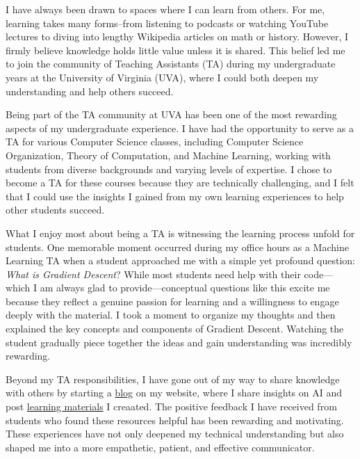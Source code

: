 \documentclass[10pt]{article}
\begin{document}
I have always been drawn to spaces where I can learn from others. For me, learning takes many forms--from listening to podcasts or watching YouTube lectures to diving into lengthy Wikipedia articles on math or history. However, I firmly believe knowledge holds little value unless it is shared. This belief led me to join the community of Teaching Assistants (TA) during my undergraduate years at the University of Virginia (UVA), where I could both deepen my understanding and help others succeed.

Being part of the TA community at UVA has been one of the most rewarding aspects of my undergraduate experience. I have had the opportunity to serve as a TA for various Computer Science classes, including Computer Science Organization, Theory of Computation, and Machine Learning, working with students from diverse backgrounds and varying levels of expertise. I chose to become a TA for these courses because they are technically challenging, and I felt that I could use the insights I gained from my own learning experiences to help other students succeed.

What I enjoy most about being a TA is witnessing the learning process unfold for students. One memorable moment occurred during my office hours as a Machine Learning TA when a student approached me with a simple yet profound question: \textit{What is Gradient Descent}? While most students need help with their code—which I am always glad to provide—conceptual questions like this excite me because they reflect a genuine passion for learning and a willingness to engage deeply with the material. I took a moment to organize my thoughts and then explained the key concepts and components of Gradient Descent. Watching the student gradually piece together the ideas and gain understanding was incredibly rewarding.

Beyond my TA responsibilities, I have gone out of my way to share knowledge with others by starting a \href{https://www.brandonyifanyang.com/blog}{blog} on my website, where I share insights on AI and post \href{https://www.brandonyifanyang.com/notes}{learning materials} I creaated. The positive feedback I have received from students who found these resources helpful has been rewarding and motivating. These experiences have not only deepened my technical understanding but also shaped me into a more empathetic, patient, and effective communicator.
\end{document}
